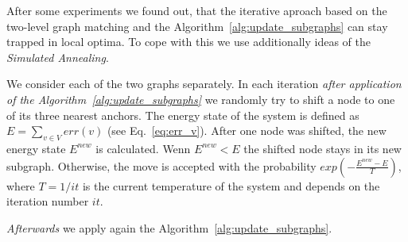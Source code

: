 After some experiments we found out, that the iterative aproach based on the two-level graph matching and the Algorithm~\ref{alg:update_subgraphs} can stay trapped in local optima.
To cope with this we use additionally ideas of the \emph{Simulated Annealing}.

We consider each of the two graphs separately. In each iteration \emph{after application of the Algorithm~\ref{alg:update_subgraphs}} we randomly try to shift a node to one of its three nearest anchors. The energy state of the system is defined as $E = \sum_{v\in V}err(v)$ (see Eq.~\ref{eq:err_v}). After one node was shifted, the new energy state $E^{new}$ is calculated. Wenn $E^{new}<E$ the shifted node stays in its new subgraph. Otherwise, the move is accepted with the probability $exp(-\frac{E^{new}-E}{T})$, where $T = 1/{it}$ is the current temperature of the system and depends on the iteration number $it$. 

\emph{Afterwards} we apply again the Algorithm~\ref{alg:update_subgraphs}. 
